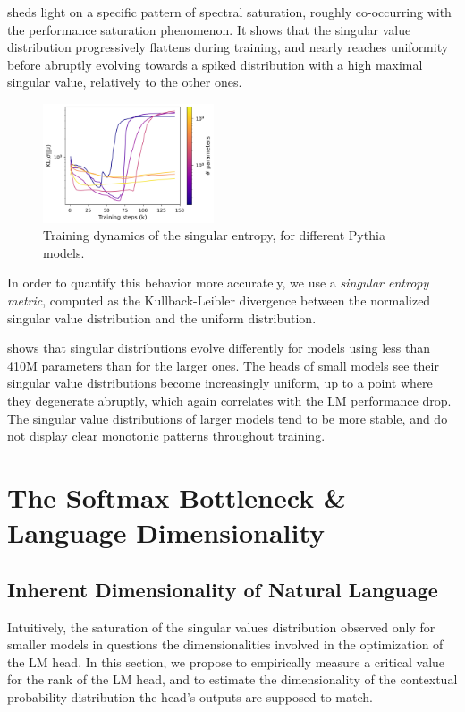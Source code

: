  sheds light on a specific pattern of spectral saturation, roughly co-occurring with the performance saturation phenomenon. It shows that the singular value distribution progressively flattens during training, and nearly reaches uniformity before abruptly evolving towards a spiked distribution with a high maximal singular value, relatively to the other ones.

\begin{figure}
\centering
    \includegraphics[width=0.45\textwidth]{sources/part_1/softmax_bottleneck/imgs/kullback_uni.png}
    \caption{Training dynamics of the singular entropy, for different Pythia models.}
    \vspace{-10pt}

    \label{fig:kl_div}
\end{figure}

In order to quantify this behavior more accurately, we use a \textit{singular entropy metric}, computed as the Kullback-Leibler divergence between the normalized singular value distribution and the uniform distribution.

 shows that singular distributions evolve differently for models using less than 410M parameters than for the larger ones. The heads of small models see their singular value distributions become increasingly uniform, up to a point where they degenerate abruptly, which again correlates with the LM performance drop. The singular value distributions of larger models tend to be more stable, and do not display clear monotonic patterns throughout training.

\section{The Softmax Bottleneck \& Language Dimensionality}
\subsection{Inherent Dimensionality of Natural Language}
\label{sec:inherent_dim}
Intuitively, the saturation of the singular values distribution observed only for smaller models in  questions the dimensionalities involved in the optimization of the LM head. In this section, we propose to empirically measure a critical value for the rank of the LM head, and to estimate the dimensionality of the contextual probability distribution the head's outputs are supposed to match.

